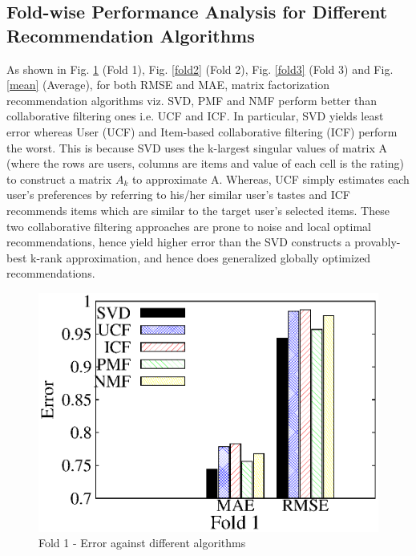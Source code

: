 \documentclass[journal,onecolumn]{IEEEtran}
\begin{document}
\subsection{Fold-wise Performance Analysis for Different Recommendation Algorithms}
As shown in Fig. \ref{fold1} (Fold 1), Fig. \ref{fold2} (Fold 2), Fig.  \ref{fold3} (Fold 3) and Fig. \ref{mean} (Average), for both RMSE and MAE, matrix factorization recommendation algorithms viz. SVD, PMF and NMF perform better than collaborative filtering ones i.e. UCF and ICF. In particular, SVD yields least error whereas User (UCF) and Item-based collaborative filtering (ICF) perform the worst. This is because SVD uses the k-largest singular values of matrix A (where the rows are users, columns are items and value of each cell is the rating) to construct a matrix $A_k$ to approximate A. Whereas, UCF simply estimates each user's preferences by referring to his/her similar user's tastes and ICF recommends items which are similar to the target user's selected items. These two collaborative filtering approaches are prone to noise and local optimal recommendations, hence yield higher error than the SVD constructs a provably-best k-rank approximation, and hence does generalized globally optimized recommendations.

\begin{figure}[H]
\begin{center}
 \includegraphics[scale = 0.98] {images/fold1.eps}
 \caption {Fold 1 - Error against different algorithms} \label{fold1}
 \end{center}
\end{figure}
\end{document}
